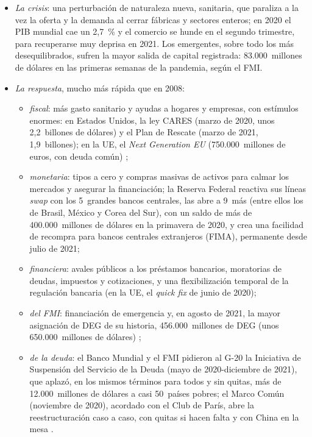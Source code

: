 \documentclass[11pt]{article}
\begin{document}
\begin{itemize}
\item \emph{La crisis}: una perturbación de naturaleza nueva, sanitaria, que paraliza a la vez la oferta y la demanda al cerrar fábricas y sectores enteros; en 2020 el PIB mundial cae un 2,7~\% y el comercio se hunde en el segundo trimestre, para recuperarse muy deprisa en 2021\nocite{FMI2026WEOdatos}. Los emergentes, sobre todo los más desequilibrados, sufren la mayor salida de capital registrada: 83.000~millones de dólares en las primeras semanas de la pandemia, según el FMI\nocite{FMI2020Georgieva}.
\item \emph{La respuesta}, mucho más rápida que en 2008:
  \begin{itemize}
  \item \emph{fiscal}: más gasto sanitario y ayudas a hogares y empresas, con estímulos enormes: en Estados Unidos, la ley CARES (marzo de 2020, unos 2,2~billones de dólares) y el Plan de Rescate (marzo de 2021, 1,9~billones); en la UE, el \emph{Next Generation EU} (750.000~millones de euros, con deuda común) ;
  \item \emph{monetaria}: tipos a cero y compras masivas de activos para calmar los mercados y asegurar la financiación; la Reserva Federal reactiva sus líneas \emph{swap} con los 5~grandes bancos centrales, las abre a 9~más (entre ellos los de Brasil, México y Corea del Sur), con un saldo de más de 400.000~millones de dólares en la primavera de 2020, y crea una facilidad de recompra para bancos centrales extranjeros (FIMA), permanente desde julio de 2021\nocite{Fed2020Swaps,Fed2021FIMA};
  \item \emph{financiera}: avales públicos a los préstamos bancarios, moratorias de deudas, impuestos y cotizaciones, y una flexibilización temporal de la regulación bancaria (en la UE, el \emph{quick fix} de junio de 2020);
  \item \emph{del FMI}: financiación de emergencia y, en agosto de 2021, la mayor asignación de DEG de su historia, 456.000~millones de DEG (unos 650.000~millones de dólares)\nocite{FMI2021DEG} ;
  \item \emph{de la deuda}: el Banco Mundial y el FMI pidieron al G-20 la Iniciativa de Suspensión del Servicio de la Deuda (mayo de 2020-diciembre de 2021), que aplazó, en los mismos términos para todos y sin quitas, más de 12.000~millones de dólares a casi 50~países pobres; el Marco Común (noviembre de 2020), acordado con el Club de París, abre la reestructuración caso a caso, con quitas si hacen falta y con China en la mesa\nocite{G202020DSSI,G202020MarcoComun} .

\end{itemize}
\end{itemize}
\end{document}
